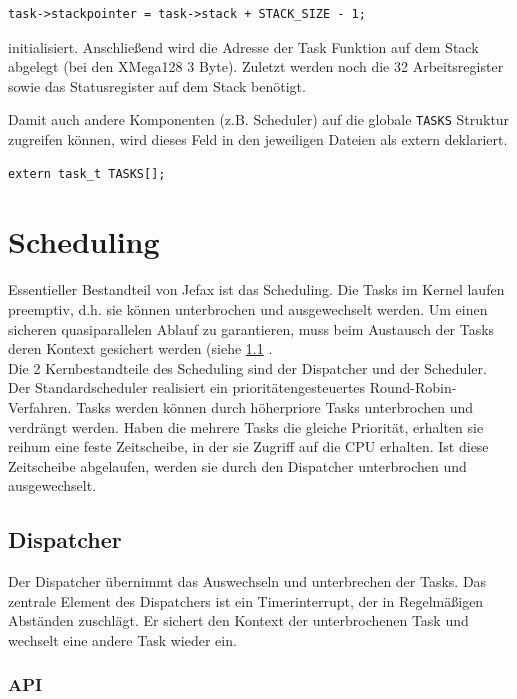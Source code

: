 \documentclass[fontsize=12pt, toc=bibliography, notitlepage]{scrreprt}
\newcommand{\refnn}[1]{\ref{#1} \nameref{#1}}
\begin{document}
\begin{lstlisting}
task->stackpointer = task->stack + STACK_SIZE - 1;
\end{lstlisting}

initialisiert. Anschließend wird die Adresse der Task Funktion auf dem Stack abgelegt (bei den XMega128 3 Byte). Zuletzt werden noch die 32 Arbeitsregister sowie das Statusregister auf dem Stack benötigt.

Damit auch andere Komponenten (z.B. Scheduler) auf die globale \lstinline$TASKS$ Struktur zugreifen können, wird dieses Feld in den jeweiligen Dateien als extern deklariert.

\begin{lstlisting}
extern task_t TASKS[];
\end{lstlisting}

\chapter{Scheduling}
\label{chap:scheduling}
Essentieller Bestandteil von Jefax ist das Scheduling. Die Tasks im Kernel laufen preemptiv, d.h. sie können unterbrochen und ausgewechselt werden. Um einen sicheren quasiparallelen Ablauf zu garantieren, muss beim Austausch der Tasks deren Kontext gesichert werden (siehe \refnn{sec:dispatcher}.\\
Die 2 Kernbestandteile des Scheduling sind der Dispatcher und der Scheduler. Der Standardscheduler realisiert ein prioritätengesteuertes Round-Robin-Verfahren. Tasks werden können durch höherpriore Tasks unterbrochen und verdrängt werden. Haben die mehrere Tasks die gleiche Priorität, erhalten sie reihum eine feste Zeitscheibe, in der sie Zugriff auf die CPU erhalten. Ist diese Zeitscheibe abgelaufen, werden sie durch den Dispatcher unterbrochen und ausgewechselt.

\section{Dispatcher}
\label{sec:dispatcher}
Der Dispatcher übernimmt das Auswechseln und unterbrechen der Tasks. Das zentrale Element des Dispatchers ist ein Timerinterrupt, der in Regelmäßigen Abständen zuschlägt. Er sichert den Kontext der unterbrochenen Task und wechselt eine andere Task wieder ein.

\subsection{API}
\label{subsec:dispatcher-api}
\end{document}
